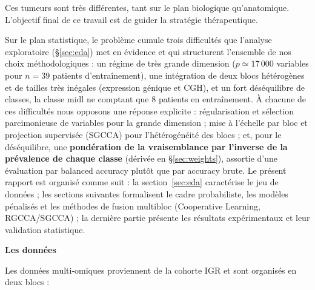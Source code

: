 \documentclass[a4paper,11pt]{paper}
\theoremstyle{plain}
\theoremstyle{definition}
\theoremstyle{remark}
\begin{document}
Ces tumeurs sont très différentes, tant sur le plan biologique qu'anatomique. L'objectif final de ce travail est de guider la stratégie thérapeutique.

Sur le plan statistique, le problème cumule trois difficultés que l'analyse exploratoire (§\ref{sec:eda}) met en évidence et qui structurent l'ensemble de nos choix méthodologiques : un régime de très grande dimension ($p \simeq 17\,000$ variables pour $n = 39$ patients d'entraînement), une intégration de deux blocs hétérogènes et de tailles très inégales (expression génique et CGH), et un fort déséquilibre de classes, la classe $\text{midl}$ ne comptant que $8$ patients en entraînement. À chacune de ces difficultés nous opposons une réponse explicite : régularisation et sélection parcimonieuse de variables pour la grande dimension ; mise à l'échelle par bloc et projection supervisée (SGCCA) pour l'hétérogénéité des blocs ; et, pour le déséquilibre, une \textbf{pondération de la vraisemblance par l'inverse de la prévalence de chaque classe} (dérivée en §\ref{sec:weights}), assortie d'une évaluation par balanced accuracy plutôt que par accuracy brute. Le présent rapport est organisé comme suit : la section~\ref{sec:eda} caractérise le jeu de données ; les sections suivantes formalisent le cadre probabiliste, les modèles pénalisés et les méthodes de fusion multibloc (Cooperative Learning, RGCCA/SGCCA) ; la dernière partie présente les résultats expérimentaux et leur validation statistique.


\begin{center}
    \Large \textbf{Les données}
\end{center}

Les données multi-omiques proviennent de la cohorte IGR et sont organisés en deux blocs :

\bigskip
\end{document}
